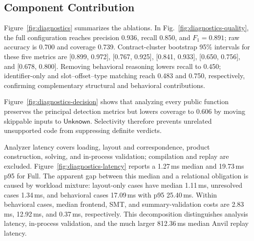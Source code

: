 \documentclass[runningheads]{llncs}
\newcommand{\Unknown}{\mathsf{Unknown}}
\begin{document}
\subsection{Component Contribution}
\label{subsec:component-results}

Figure~\ref{fig:diagnostics} summarizes the ablations. In Fig.~\ref{fig:diagnostics-quality}, the full configuration reaches precision 0.936, recall 0.850, and \(F_1=0.891\); raw accuracy is 0.700 and coverage 0.739. Contract-cluster bootstrap 95\% intervals for these five metrics are [0.899, 0.972], [0.767, 0.925], [0.841, 0.933], [0.650, 0.756], and [0.678, 0.800]. Removing behavioral reasoning lowers recall to 0.450; identifier-only and slot--offset--type matching reach 0.483 and 0.750, respectively, confirming complementary structural and behavioral contributions.

Figure~\ref{fig:diagnostics-decision} shows that analyzing every public function preserves the principal detection metrics but lowers coverage to 0.606 by moving skippable inputs to \(\Unknown\). Selectivity therefore prevents unrelated unsupported code from suppressing definite verdicts.

Analyzer latency covers loading, layout and correspondence, product construction, solving, and in-process validation; compilation and replay are excluded. Figure~\ref{fig:diagnostics-latency} reports a 1.27\,ms median and 19.73\,ms p95 for Full. The apparent gap between this median and a relational obligation is caused by workload mixture: layout-only cases have median 1.11\,ms, unresolved cases 1.34\,ms, and behavioral cases 17.09\,ms with p95 25.40\,ms. Within behavioral cases, median frontend, SMT, and summary-validation costs are 2.83\,ms, 12.92\,ms, and 0.37\,ms, respectively. This decomposition distinguishes analysis latency, in-process validation, and the much larger 812.36\,ms median Anvil replay latency.
\end{document}
